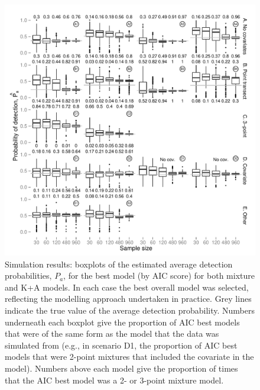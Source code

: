 \documentclass{report}
\begin{document}
\begin{figure}[H]
\centering
\includegraphics[width=\textwidth]{simulations/pa-plot-combined.pdf}
\caption{Simulation results: boxplots of the estimated average detection probabilities, $P_a$, for the best model (by AIC score) for both mixture and K+A models. In each case the best overall model was selected, reflecting the modelling approach undertaken in practice. Grey lines indicate the true value of the average detection probability. Numbers underneath each boxplot give the proportion of AIC best models that were of the same form as the model that the data was simulated from (e.g., in scenario D1, the proportion of AIC best models that were 2-point mixtures that included the covariate in the model). Numbers above each model give the proportion of times that the AIC best model was a 2- or 3-point mixture model.}
\label{sim-boxplots-combined}
\end{figure}
\end{document}
